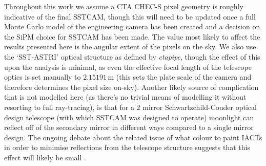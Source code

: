 Throughout this work we assume a CTA CHEC-S pixel geometry is roughly indicative of the final SSTCAM, though this will need to be updated once a full Monte Carlo model of the engineering camera has been created and a decision on the SiPM choice for SSTCAM has been made. The value most likely to affect the results presented here is the angular extent of the pixels on the sky. We also use the `SST-ASTRI' optical structure as defined by \textit{ctapipe}, though the effect of this upon the analysis is minimal, as even the effective focal length of the telescope optics is set manually to $\mathrm{2.15191\,m}$ (this sets the plate scale of the camera and therefore determines the pixel size on-sky). Another likely source of complication that is not modelled here (as there's no trivial means of modelling it without resorting to full ray-tracing), is that for a 2 mirror Schwartzchild-Couder optical design telescope (with which SSTCAM was designed to operate) moonlight can reflect off of the secondary mirror in different ways compared to a single mirror design. The ongoing debate about the related issue of what colour to paint IACTs in order to minimise reflections from the telescope structure suggests that this effect will likely be small \cite{pinktelescope}.

\label{sec:examples}
